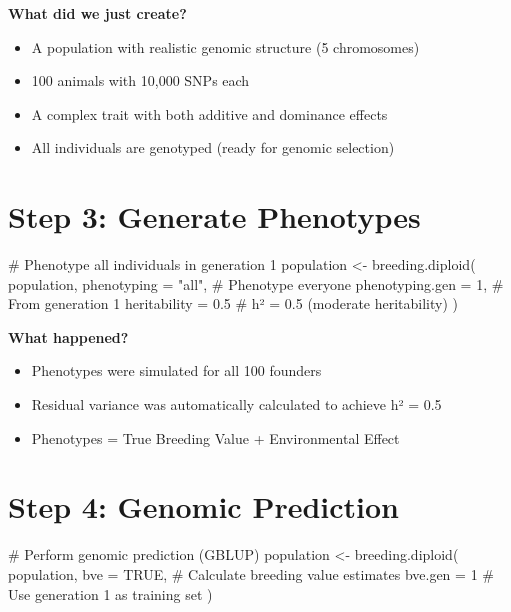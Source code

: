\documentclass[
  letterpaper,
]{book}
\newenvironment{Shaded}{\begin{snugshade}}{\end{snugshade}}
\newcommand{\AttributeTok}[1]{\textcolor[rgb]{0.40,0.45,0.13}{#1}}
\newcommand{\CommentTok}[1]{\textcolor[rgb]{0.37,0.37,0.37}{#1}}
\newcommand{\ConstantTok}[1]{\textcolor[rgb]{0.56,0.35,0.01}{#1}}
\newcommand{\DecValTok}[1]{\textcolor[rgb]{0.68,0.00,0.00}{#1}}
\newcommand{\FloatTok}[1]{\textcolor[rgb]{0.68,0.00,0.00}{#1}}
\newcommand{\FunctionTok}[1]{\textcolor[rgb]{0.28,0.35,0.67}{#1}}
\newcommand{\NormalTok}[1]{\textcolor[rgb]{0.00,0.23,0.31}{#1}}
\newcommand{\OtherTok}[1]{\textcolor[rgb]{0.00,0.23,0.31}{#1}}
\newcommand{\StringTok}[1]{\textcolor[rgb]{0.13,0.47,0.30}{#1}}
\providecommand{\tightlist}{%
  \setlength{\itemsep}{0pt}\setlength{\parskip}{0pt}}
\begin{document}
\textbf{What did we just create?}

\begin{itemize}
\tightlist
\item
  A population with realistic genomic structure (5 chromosomes)
\item
  100 animals with 10,000 SNPs each
\item
  A complex trait with both additive and dominance effects
\item
  All individuals are genotyped (ready for genomic selection)
\end{itemize}

\section{Step 3: Generate Phenotypes}\label{sec-phenotype}

\begin{Shaded}
\begin{Highlighting}[]
\CommentTok{\# Phenotype all individuals in generation 1}
\NormalTok{population }\OtherTok{\textless{}{-}} \FunctionTok{breeding.diploid}\NormalTok{(}
\NormalTok{  population,}
  \AttributeTok{phenotyping =} \StringTok{"all"}\NormalTok{,         }\CommentTok{\# Phenotype everyone}
  \AttributeTok{phenotyping.gen =} \DecValTok{1}\NormalTok{,         }\CommentTok{\# From generation 1}
  \AttributeTok{heritability =} \FloatTok{0.5}           \CommentTok{\# h² = 0.5 (moderate heritability)}
\NormalTok{)}
\end{Highlighting}
\end{Shaded}

\textbf{What happened?}

\begin{itemize}
\tightlist
\item
  Phenotypes were simulated for all 100 founders
\item
  Residual variance was automatically calculated to achieve h² = 0.5
\item
  Phenotypes = True Breeding Value + Environmental Effect
\end{itemize}

\section{Step 4: Genomic Prediction}\label{sec-prediction}

\begin{Shaded}
\begin{Highlighting}[]
\CommentTok{\# Perform genomic prediction (GBLUP)}
\NormalTok{population }\OtherTok{\textless{}{-}} \FunctionTok{breeding.diploid}\NormalTok{(}
\NormalTok{  population,}
  \AttributeTok{bve =} \ConstantTok{TRUE}\NormalTok{,                  }\CommentTok{\# Calculate breeding value estimates}
  \AttributeTok{bve.gen =} \DecValTok{1}                  \CommentTok{\# Use generation 1 as training set}
\NormalTok{)}
\end{Highlighting}
\end{Shaded}
\end{document}
